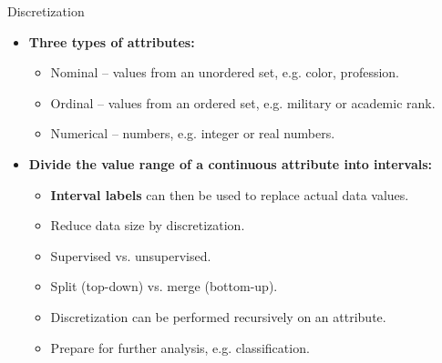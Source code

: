\begin{frame}{Discretization}
	\begin{itemize}
		\item \textbf{Three types of attributes:}
		\begin{itemize}
			\item Nominal -- values from an unordered set, e.g. color, 
			profession.
			\item Ordinal -- values from an ordered set, e.g. military or 
			academic rank.
			\item Numerical -- numbers, e.g. integer or real numbers.
		\end{itemize}
		\item \textbf{Divide the value range of a continuous attribute into 
		intervals:}
		\begin{itemize}
			\item \textbf{Interval labels} can then be used to replace actual 
			data values.
			\item Reduce data size by discretization.
			\item Supervised vs. unsupervised.
			\item Split (top-down) vs. merge (bottom-up).
			\item Discretization can be performed recursively on an attribute.
			\item Prepare for further analysis, e.g. classification.
		\end{itemize}
	\end{itemize}
\end{frame}

